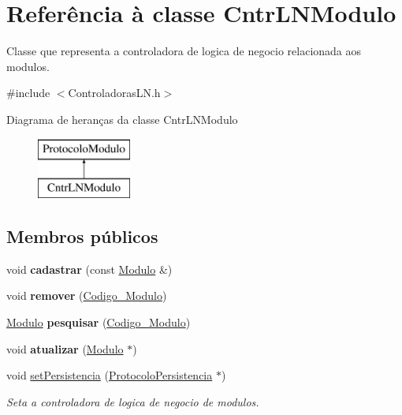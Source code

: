 \hypertarget{class_cntr_l_n_modulo}{
\section{\-Referência à classe \-Cntr\-L\-N\-Modulo}
\label{class_cntr_l_n_modulo}
}


\-Classe que representa a controladora de logica de negocio relacionada aos modulos.  




{\ttfamily \#include $<$\-Controladoras\-L\-N.\-h$>$}

\-Diagrama de heranças da classe \-Cntr\-L\-N\-Modulo\begin{figure}[H]
\begin{center}
\leavevmode
\includegraphics[height=2.000000cm]{class_cntr_l_n_modulo}
\end{center}
\end{figure}
\subsection*{\-Membros públicos}
\begin{DoxyCompactItemize}
\item 
\hypertarget{class_cntr_l_n_modulo_a4552fd67087d47ac4121077a6db07774}{
void {\bfseries cadastrar} (const \hyperlink{class_modulo}{\-Modulo} \&)}
\label{class_cntr_l_n_modulo_a4552fd67087d47ac4121077a6db07774}

\item 
\hypertarget{class_cntr_l_n_modulo_a189457ea86d4de9db66cdc6e72a71c68}{
void {\bfseries remover} (\hyperlink{class_codigo___modulo}{\-Codigo\-\_\-\-Modulo})}
\label{class_cntr_l_n_modulo_a189457ea86d4de9db66cdc6e72a71c68}

\item 
\hypertarget{class_cntr_l_n_modulo_a95cd617ebfb9ecce805a8179c69ee36c}{
\hyperlink{class_modulo}{\-Modulo} {\bfseries pesquisar} (\hyperlink{class_codigo___modulo}{\-Codigo\-\_\-\-Modulo})}
\label{class_cntr_l_n_modulo_a95cd617ebfb9ecce805a8179c69ee36c}

\item 
\hypertarget{class_cntr_l_n_modulo_a91ebd74da8a474ff6a9c5a06e19ae746}{
void {\bfseries atualizar} (\hyperlink{class_modulo}{\-Modulo} $\ast$)}
\label{class_cntr_l_n_modulo_a91ebd74da8a474ff6a9c5a06e19ae746}

\item 
void \hyperlink{class_cntr_l_n_modulo_a7c5c6328344a3318e9609c003decb411}{set\-Persistencia} (\hyperlink{class_protocolo_persistencia}{\-Protocolo\-Persistencia} $\ast$)
\begin{DoxyCompactList}\small\item\em \-Seta a controladora de logica de negocio de modulos. \end{DoxyCompactList}\end{DoxyCompactItemize}
